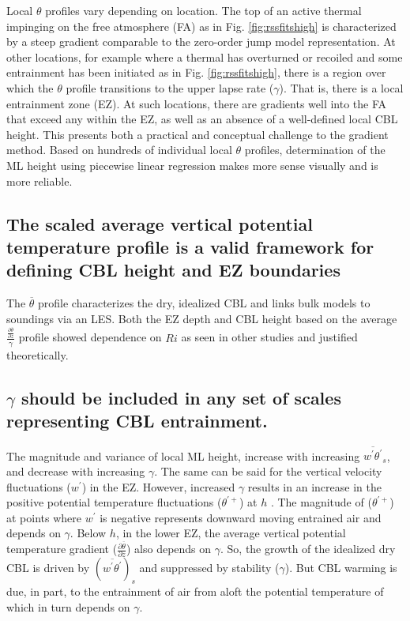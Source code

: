 \documentclass[referee]{svjour3}
\begin{document}
Local $\theta$ profiles vary depending on location.  The top of an active thermal impinging on the free atmosphere (FA) as in Fig. \ref{fig:rssfitshigh} is characterized by a steep gradient comparable to the zero-order jump model representation.  At other locations, for example where a thermal has overturned or recoiled and some entrainment has been initiated as in Fig. \ref{fig:rssfitshigh}, there is a region over which the $\theta$ profile transitions to the upper lapse rate ($\gamma$). That is, there is a local entrainment zone (EZ).  At such locations, there are gradients well into the FA that exceed any within the EZ, as well as an absence of a well-defined local CBL height.  This presents both a practical and conceptual challenge to the gradient method.  Based on hundreds of individual local $\theta$ profiles, determination of the ML height using piecewise linear regression makes more sense visually and is more reliable. 

\subsection{The scaled average vertical potential temperature profile is a valid framework for defining CBL height and EZ boundaries}

The $\overline{\theta}$ profile characterizes the dry, idealized CBL and links bulk models to soundings via an LES.  Both the EZ depth and CBL height based on the average $\frac{\frac{\partial \overline{\theta}}{\partial z}}{\gamma}$ profile showed dependence on $Ri$ as seen in other studies and justified theoretically.  

\subsection{$\gamma$ should be included in any set of scales representing CBL entrainment.}

The magnitude and variance of local ML height, increase with increasing $\overline{w^{'}\theta^{'}}_{s}$, and decrease with increasing $\gamma$.  The same can be said for the vertical velocity fluctuations ($w^{'}$) in the EZ.  However, increased $\gamma$ results in an increase in the positive potential temperature fluctuations ($\theta^{'+}$) at $h$ \citep{Nchap14}. The magnitude of ($\theta^{'+}$) at points where $w^{'}$ is negative represents downward moving entrained air and depends on $\gamma$.  Below $h$, in the lower EZ, the average vertical potential temperature gradient ($\frac{\partial \overline{\theta}}{\partial z}$) also depends on $\gamma$. So, the growth of the idealized dry CBL is driven by $(\overline{w^{'}\theta^{'}})_{s}$ and suppressed by stability ($\gamma$). But CBL warming is due, in part, to the entrainment of air from aloft the potential temperature of which in turn depends on $\gamma$.\\
\end{document}

